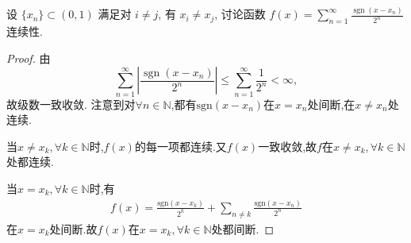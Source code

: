 \documentclass[../../main.tex]{subfiles}%
\begin{document}
\begin{example}
设 $\{x_n\} \subset (0,1)$ 满足对 $i \neq j$, 有 $x_i \neq x_j$, 讨论函数 $f(x) = \sum\limits_{n=1}^\infty \frac{\operatorname{sgn}(x - x_n)}{2^n}$ 连续性.
\end{example}
\begin{proof}

由
\[
\sum\limits_{n=1}^\infty \left| \frac{\operatorname{sgn}(x - x_n)}{2^n} \right| \leqslant \sum\limits_{n=1}^\infty \frac{1}{2^n} < \infty,
\]
故级数一致收敛. 注意到对$\forall n\in \mathbb{N} $,都有$\mathrm{sgn} \left( x-x_n \right) $在$x=x_n$处间断,在$x\ne x_n$处连续.

当$x\ne x_k,\forall k\in \mathbb{N} $时,$f\left( x \right) $的每一项都连续.又$f\left( x \right) $一致收敛,故$f$在$x\ne x_k,\forall k\in \mathbb{N} $处都连续.

当$x=x_k,\forall k\in \mathbb{N} $时,有
\begin{align*}
f\left( x \right) =\frac{\mathrm{sgn} \left( x-x_k \right)}{2^k}+\sum\limits_{n\ne k}{\frac{\mathrm{sgn} \left( x-x_n \right)}{2^n}}
\end{align*}
在$x=x_k$处间断.故$f\left( x \right) $在$x=x_k,\forall k\in \mathbb{N} $处都间断.

\end{proof}
\end{document}

